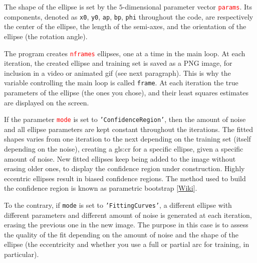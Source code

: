 \documentclass[oneside,10pt]{book}
\begin{document}
The shape of the ellipse is set by the $5$-dimensional parameter vector \textcolor{red}{\texttt{params}}. Its components, denoted
 as \texttt{x0}, \texttt{y0}, \texttt{ap}, \texttt{bp}, \texttt{phi} throughout the code, are respectively the center of the ellipse, the length of the semi-axes, and the orientation of the ellipse (the rotation angle). \vspace{1ex}

 \vspace{1ex}

\noindent The program creates \textcolor{red}{\texttt{nframes}} ellipses, one at a time in the main loop.
 At each iteration, the created ellipse and training set is saved as a PNG image, for inclusion in a video or animated gif (see next paragraph). This is why the variable controlling the main loop is called  \texttt{frame}. At each iteration the true parameters of the ellipse (the ones you chose), and their least squares estimates are displayed on the screen. 

If the parameter \textcolor{red}{\texttt{mode}} is set to \texttt{'ConfidenceRegion'}, then the amount of noise and all ellipse parameters are kept constant throughout the iterations. The fitted shapes varies from one iteration to the next depending on the training set (itself depending on the noise), creating a \gls{gls:cr} for a specific ellipse, given a specific amount of noise. New fitted ellipses keep being added to the image without erasing older ones, to display the confidence region under construction. Highly eccentric ellipses result in biased confidence regions.
 The method used to build the confidence region is known as \textcolor{index}{parametric bootstrap} [\href{https://en.wikipedia.org/wiki/Bootstrapping_(statistics)#Parametric_bootstrap}{Wiki}]. 

To the contrary, if \texttt{mode} is set to \texttt{'FittingCurves'}, a different ellipse with different parameters and different amount of noise is generated at each iteration, erasing the previous one in the new image. The purpose in this case is to assess the quality of the fit depending on the amount of noise and 
 the shape of the ellipse (the eccentricity and whether you use a full or partial arc for training, in particular).\vspace{1ex}

 \vspace{1ex}
\end{document}

